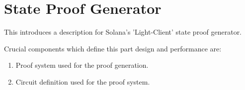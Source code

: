 \chapter{State Proof Generator}

This introduces a description for Solana's 'Light-Client' state proof generator.

Crucial components which define this part design and performance are:
\begin{enumerate}
    \item Proof system used for the proof generation.
    \item Circuit definition used for the proof system.
\end{enumerate}












